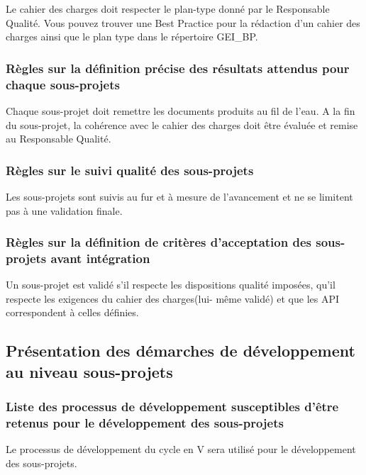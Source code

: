             Le cahier des charges doit respecter le plan-type donné par le
            Responsable Qualité. Vous pouvez trouver une Best Practice pour la
            rédaction d'un cahier des charges ainsi que le plan type dans le 
            répertoire GEI\_BP.

        \subsubsection{Règles sur la définition précise des résultats attendus 
            pour chaque sous-projets}

            Chaque sous-projet doit remettre les documents produits au fil de
            l'eau. A la fin du sous-projet, la cohérence avec le cahier des 
            charges doit être évaluée et remise au Responsable Qualité.            

        \subsubsection{Règles sur le suivi qualité des sous-projets}

            Les sous-projets sont suivis au fur et à mesure de l'avancement et 
            ne se limitent pas à une validation finale.

        \subsubsection{Règles sur la définition de critères d’acceptation des 
            sous-projets avant intégration}

            Un sous-projet est validé s'il respecte les dispositions qualité 
            imposées, qu'il respecte les exigences du cahier des charges(lui-
            même validé) et que les API correspondent à celles définies.

    \subsection{Présentation des démarches de développement au niveau 
            sous-projets}

        \subsubsection{Liste des processus de développement susceptibles d’être 
            retenus pour le développement des sous-projets}

            Le processus de développement du cycle en V sera utilisé pour le
            développement des sous-projets.

